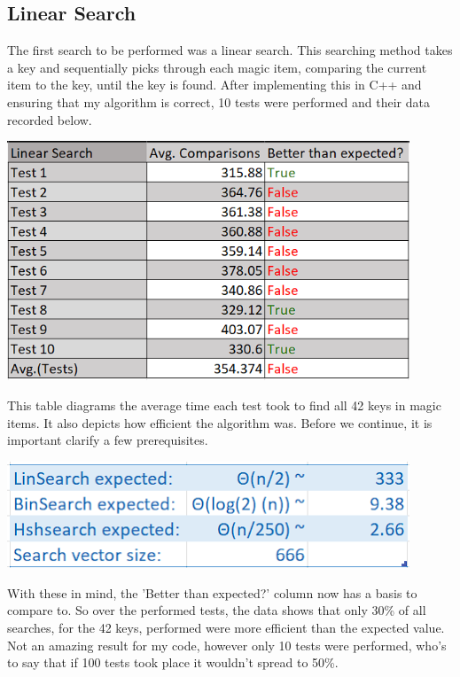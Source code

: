 \documentclass[12pt, letterpaper]{article}
\begin{document}
\subsection{Linear Search} \label{LinSch}
The first search to be performed was a linear search.
This searching method takes a key and sequentially picks through each magic item, comparing the current item to the key, until the key is found.
After implementing this in C++ and ensuring that my algorithm is correct, 10 tests were performed and their data recorded below.
\begin{center}
   \includegraphics[width=120mm,scale=0.5]{LinSearch.png}
\end{center}
This table diagrams the average time each test took to find all 42 keys in magic items. 
It also depicts how efficient the algorithm was.
Before we continue, it is important clarify a few prerequisites.
\begin{center}
   \includegraphics[width=120mm,scale=0.5]{Prerequisites.png}
\end{center}
With these in mind, the 'Better than expected?' column now has a basis to compare to.
So over the performed tests, the data shows that only 30\% of all searches, for the 42 keys, performed were more efficient than the expected value.
Not an amazing result for my code, however only 10 tests were performed, who's to say that if 100 tests took place it wouldn't spread to 50\%.
\end{document}
